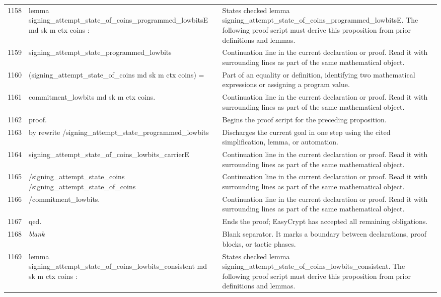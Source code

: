 \documentclass[10pt]{article}
\begin{document}
\begin{longtable}{r L{0.53\textwidth} L{0.37\textwidth}}
1158 & {\ttfamily\scriptsize lemma signing\_attempt\_state\_of\_coins\_programmed\_lowbitsE md sk m ctx coins :} & States checked lemma signing\_attempt\_state\_of\_coins\_programmed\_lowbitsE.  The following proof script must derive this proposition from prior definitions and lemmas. \\
1159 & {\ttfamily\scriptsize   signing\_attempt\_state\_programmed\_lowbits} & Continuation line in the current declaration or proof.  Read it with surrounding lines as part of the same mathematical object. \\
1160 & {\ttfamily\scriptsize     (signing\_attempt\_state\_of\_coins md sk m ctx coins) =} & Part of an equality or definition, identifying two mathematical expressions or assigning a program value. \\
1161 & {\ttfamily\scriptsize   commitment\_lowbits md sk m ctx coins.} & Continuation line in the current declaration or proof.  Read it with surrounding lines as part of the same mathematical object. \\
1162 & {\ttfamily\scriptsize proof.} & Begins the proof script for the preceding proposition. \\
1163 & {\ttfamily\scriptsize by rewrite /signing\_attempt\_state\_programmed\_lowbits} & Discharges the current goal in one step using the cited simplification, lemma, or automation. \\
1164 & {\ttfamily\scriptsize            signing\_attempt\_state\_of\_coins\_lowbits\_carrierE} & Continuation line in the current declaration or proof.  Read it with surrounding lines as part of the same mathematical object. \\
1165 & {\ttfamily\scriptsize            /signing\_attempt\_state\_coins /signing\_attempt\_state\_of\_coins} & Continuation line in the current declaration or proof.  Read it with surrounding lines as part of the same mathematical object. \\
1166 & {\ttfamily\scriptsize            /commitment\_lowbits.} & Continuation line in the current declaration or proof.  Read it with surrounding lines as part of the same mathematical object. \\
1167 & {\ttfamily\scriptsize qed.} & Ends the proof; EasyCrypt has accepted all remaining obligations. \\
1168 & {\ttfamily\scriptsize \emph{blank}} & Blank separator.  It marks a boundary between declarations, proof blocks, or tactic phases. \\
1169 & {\ttfamily\scriptsize lemma signing\_attempt\_state\_of\_coins\_lowbits\_consistent md sk m ctx coins :} & States checked lemma signing\_attempt\_state\_of\_coins\_lowbits\_consistent.  The following proof script must derive this proposition from prior definitions and lemmas. \\

\end{longtable}
\end{document}
